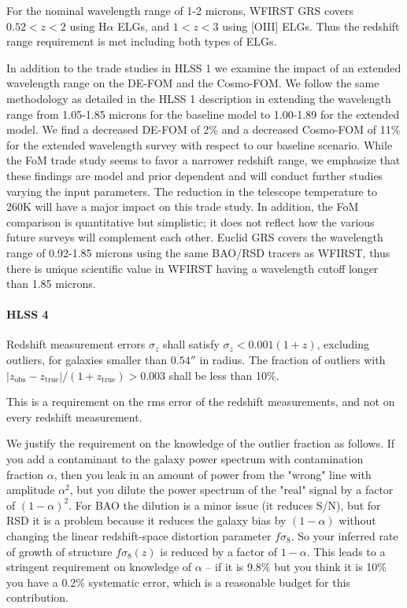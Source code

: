  For the nominal wavelength range of 1-2 microns, WFIRST GRS covers $0.52 < z <
 2$ using H$\alpha$ ELGs, and $1 < z < 3$ using [OIII] ELGs. Thus the redshift range
 requirement is met including both types of ELGs.

 In addition to the trade studies in HLSS 1 we examine the impact of an extended
 wavelength range on the DE-FOM and the Cosmo-FOM. We follow the same methodology
 as detailed in the HLSS 1 description in extending the wavelength range from
 1.05-1.85 microns for the baseline model to 1.00-1.89 for the extended model.
 We find a decreased DE-FOM of 2\% and a decreased
 Cosmo-FOM of 11\% for the extended wavelength survey with respect to our
 baseline scenario. While the FoM trade study seems to favor a narrower redshift
 range, we emphasize that these findings are model and prior dependent and will
 conduct further studies varying the input parameters. The reduction in the
 telescope temperature to 260K will have a major impact on this trade study. In
 addition, the FoM comparison is quantitative but simplistic; it does not reflect
 how the various future surveys will complement each other. Euclid GRS covers the
 wavelength range of 0.92-1.85 microns using the same BAO/RSD tracers as WFIRST,
 thus there is unique scientific value in WFIRST having a wavelength cutoff
 longer than 1.85 microns.

\paragraph{HLSS 4} Redshift measurement errors $\sigma_z$ shall satisfy $\sigma_z < 0.001(1+z)$, excluding outliers, for galaxies smaller than $0.54''$ in radius. The fraction of outliers with $|z_\mathrm{obs}-
 z_\mathrm{true}|/(1+z_\mathrm{true})>0.003$ shall be less than 10\%.

 This is a requirement on the rms error of the redshift measurements, and not on
 every redshift measurement.

 We justify the requirement on the knowledge of the outlier fraction as follows.
 If you add a contaminant to the galaxy power spectrum with contamination
 fraction $\alpha$, then you leak in an amount of power from the "wrong" line
 with amplitude $\alpha^2$, but you dilute the power spectrum of the "real"
 signal by a factor of $(1-\alpha)^2$. For BAO the dilution is a minor issue (it
 reduces S/N), but for RSD it is a problem because it reduces the galaxy bias by
 $(1-\alpha)$ without changing the linear redshift-space distortion parameter
 $f\sigma_8$. So your inferred rate of growth of structure $f\sigma_8(z)$ is
 reduced by a factor of $1-\alpha$.  This leads to a stringent requirement on
 knowledge of $\alpha$ -- if it is 9.8\% but you think it is 10\% you have a
 0.2\% systematic error, which is a reasonable budget for this contribution.

